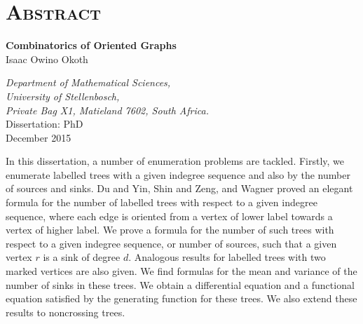 \chapter*{\huge\scshape  Abstract} 
 \begin{center}
 {\large \textbf{Combinatorics of Oriented Graphs}}\\
 \vspace*{0.6cm}
 Isaac Owino Okoth
 
 \emph{Department of Mathematical Sciences,\\
 University of Stellenbosch,\\
 Private Bag X1, Matieland 7602, South Africa.}\\
  \vspace*{0.6cm}
 Dissertation: PhD\\
  \vspace*{0.2cm}
  December 2015 
  \end{center}
In this dissertation, a number of enumeration problems are tackled. Firstly, we enumerate labelled trees with a given indegree sequence and also by the number of sources and sinks. Du and Yin, Shin and Zeng, and Wagner proved an elegant formula for the number of labelled trees with respect to a given indegree sequence, where each edge is oriented from a vertex of  lower label towards a vertex of higher label. We prove a formula for the number of such trees with respect to a given indegree sequence, or number of sources, such that a given vertex $r$ is a sink of degree $d$. Analogous results for labelled trees with two marked vertices are also given. We find formulas for the mean and variance of the number of sinks in these trees. We obtain a differential equation and a functional equation satisfied by the generating function for these trees.  We also extend these results to noncrossing trees.


